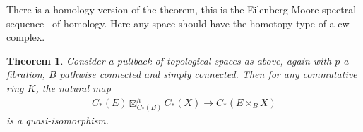\documentclass{scrartcl}
\theoremstyle{plain}
\newtheorem{theorem}{Theorem}[section]
\theoremstyle{definition}
\begin{document}


There is a homology version of the theorem, this is the Eilenberg-Moore spectral sequence~\cite{eilenberg1966homology} of homology. Here any space should have the homotopy type of a cw complex.

\begin{theorem}
    Consider a pullback of topological spaces as above, again with $p$ a fibration, $B$ pathwise connected and simply connected. Then for any commutative ring $K$, the natural map
    \begin{align*}
        C_*(E)\boxtimes_{C_*(B)}^h C_*(X) \to C_*(E\times_B X)
    \end{align*}
    is a quasi-isomorphism.
\end{theorem}
\end{document}

